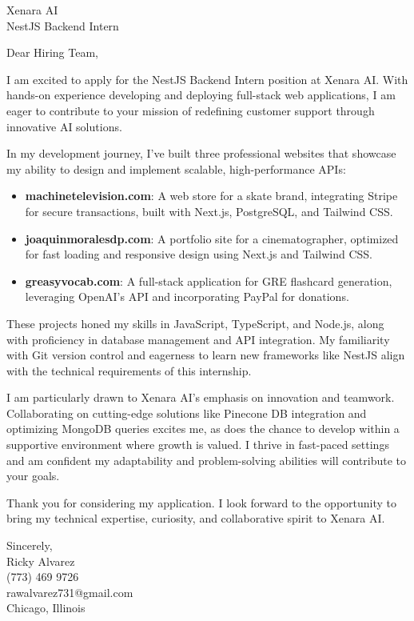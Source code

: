\documentclass[a4paper,10pt]{letter}
\begin{document}
\begin{letter}{Xenara AI \\ NestJS Backend Intern}

\opening{Dear Hiring Team,}

I am excited to apply for the NestJS Backend Intern position at Xenara AI. With hands-on experience developing and deploying full-stack web applications, I am eager to contribute to your mission of redefining customer support through innovative AI solutions.

In my development journey, I’ve built three professional websites that showcase my ability to design and implement scalable, high-performance APIs:
\begin{itemize}
    \item \textbf{machinetelevision.com}: A web store for a skate brand, integrating Stripe for secure transactions, built with Next.js, PostgreSQL, and Tailwind CSS.
    \item \textbf{joaquinmoralesdp.com}: A portfolio site for a cinematographer, optimized for fast loading and responsive design using Next.js and Tailwind CSS.
    \item \textbf{greasyvocab.com}: A full-stack application for GRE flashcard generation, leveraging OpenAI’s API and incorporating PayPal for donations.
\end{itemize}

These projects honed my skills in JavaScript, TypeScript, and Node.js, along with proficiency in database management and API integration. My familiarity with Git version control and eagerness to learn new frameworks like NestJS align with the technical requirements of this internship.

I am particularly drawn to Xenara AI’s emphasis on innovation and teamwork. Collaborating on cutting-edge solutions like Pinecone DB integration and optimizing MongoDB queries excites me, as does the chance to develop within a supportive environment where growth is valued. I thrive in fast-paced settings and am confident my adaptability and problem-solving abilities will contribute to your goals.

Thank you for considering my application. I look forward to the opportunity to bring my technical expertise, curiosity, and collaborative spirit to Xenara AI.

\vspace{1em}


Sincerely, \\ 
Ricky Alvarez \\
(773) 469 9726 \\
rawalvarez731@gmail.com \\
Chicago, Illinois

\end{letter}
\end{document}
